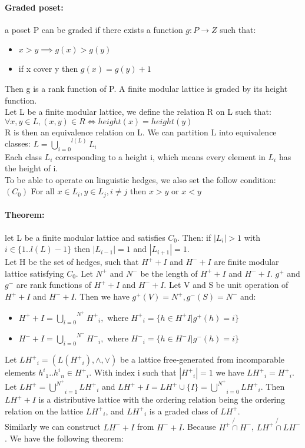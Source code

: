 \documentclass[26pt,fleqn,]{article}
\begin{document}
\paragraph{Graded poset: } a poset P can be graded if there exists a function \(g:P\to Z\) such that:
\begin{itemize}
	\item \(x > y \implies g(x) > g(y) \)
	\item if x cover y then \(g(x) = g(y) + 1\)
\end{itemize}
Then g is a rank function of P. A finite modular lattice is graded by its height function.\\
Let L be a finite modular lattice, we define the relation R on L such that: \(\forall x,y \in L, (x,y)
\in R \iff height(x) = height(y)\)\\
R is then an equivalence relation on L. We can partition L into equivalence classes: 
\(L = \overset{l(L)}{\underset{i=0}{\bigcup}} L_i\)\\
Each class \(L_i\) corresponding to a height i, which means every element in \(L_i\) has the height of i.\\
To be able to operate on linguistic hedges, we also set the follow condition:\\
\indent \((C_0)\) For all \(x \in L_i, y \in L_j, i \neq j\) then \(x>y\) or \(x<y\)
\paragraph{Theorem: } let L be a finite modular lattice and satisfies \(C_0\). Then: if \(|L_i| > 1\)
 with \(i \in \{1..l(L)-1\}\) then \(|L_{i-1}| = 1\) and \(|L_{i+1}| = 1\).\\
Let H be the set of hedges, such that \(H^+ + I\) and \(H^- + I\) are finite modular lattice
satisfying \(C_0\). Let \(N^+\) and  \(N^-\) be the length of \(H^+ +I\) and \(H^- + I\). \(g^+\) 
and \(g^-\) are rank functions of \(H^+ +I\) and \(H^-+I\). Let V and S be unit operation of \(H^+ +I\)
and \(H^-+I\). Then we have \(g^+(V) = N^+, g^-(S) = N^-\) and:\\
\begin{itemize}
	\item \(H^+ + I = \overset{N^+}{\underset{i=0}{\bigcup}} {H^+}_i, 
		\text{ where } {H^+}_i =\{ h \in H^+I| g^+(h) = i\}\)
	\item \(H^- + I = \overset{N^-}{\underset{i=0}{\bigcup}} {H^-}_i, 
		\text{ where } {H^-}_i =\{ h \in H^-I| g^-(h) = i\}\)
\end{itemize}
Let \({LH^+}_i = (L({H^+}_i), \wedge, \vee)\) be a lattice free-generated from incomparable elements
\({h^i}_1..{h^i}_n \in {H^+}_i\). With index i such that \(|{H^+}_i| = 1\) we have \({LH^+}_i = 
{H^+}_i\). Let \(LH^+ = {\bigcup^{N^+}}_{i=1} {LH^+}_i\) and \({LH^+} + I = LH^+ \cup \{I\}
= {\bigcup^{N^+}}_{i=0} {LH^+}_i\). Then \({LH^+} + I\) is a distributive lattice with the ordering
relation being the ordering relation on the lattice \({LH^+}_i\), and \({LH^+}_i\) is a graded class
of \(LH^+\).\\
Similarly we can construct \(LH^- + I\) from \(H^- + I\). Because \(H^+ \not{\cap} H^-\), \(LH^+ \not{
\cap} LH^-\). We have the following theorem:\\\\
\end{document}
